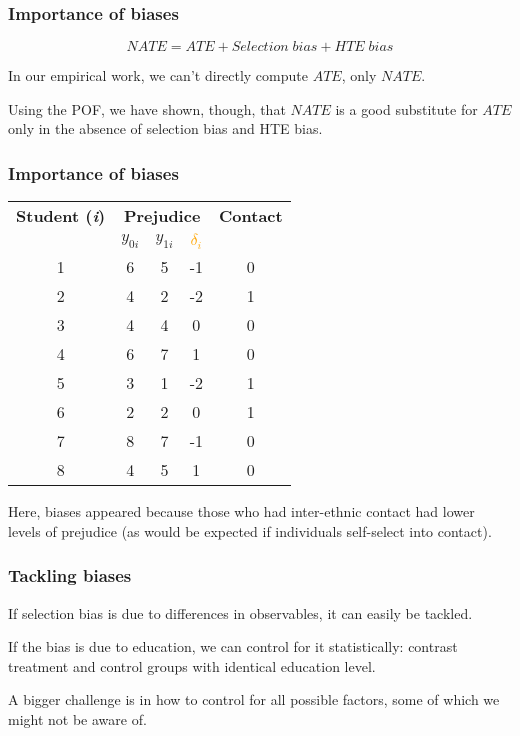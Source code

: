 \documentclass[12pt,english,dvipsnames,aspectratio=169,handout]{beamer}\usepackage[]{graphicx}\usepackage[]{xcolor}
\begin{document}
\begin{frame}
  \frametitle{Importance of biases}
  
  \begin{equation}
    NATE = ATE + Selection\;bias + HTE\;bias
  \end{equation}
  
  In our empirical work, we can't directly compute $ATE$, only $NATE$.\bigskip
  \pause
  
  Using the POF, we have shown, though, that $NATE$ is a good substitute for $ATE$ only in the absence of selection bias and HTE bias.
  
\end{frame}


\begin{frame}
  \frametitle{Importance of biases}
  
  \begin{table}[!ht]
  \centering
  \scriptsize
  \begin{tabular}{c c c c c}
  \toprule
  \textbf{Student (\textit{i})} & \multicolumn{3}{c}{\textbf{Prejudice}} & \textbf{Contact} \\
  & $y_{0i}$ & $y_{1i}$ & \textcolor{orange}{$\delta_i$} &  \\
  \midrule
  1 & 6 & 5 & -1 & 0 \\
  2 & 4 & 2 & -2 & 1 \\
  3 & 4 & 4 & 0 & 0\\
  4 & 6 & 7 & 1 & 0\\
  5 & 3 & 1 & -2 & 1 \\
  6 & 2 & 2 & 0 & 1\\
  7 & 8 & 7 & -1 & 0 \\
  8 & 4 & 5 & 1 & 0\\
  \bottomrule
  \end{tabular}
  \end{table}
  
  Here, biases appeared because those who had inter-ethnic contact had lower levels of prejudice (as would be expected if individuals self-select into contact).
  
\end{frame}

\begin{frame}
  \frametitle{Tackling biases}
  
  If selection bias is due to differences in observables, it can easily be tackled.\bigskip
  
  If the bias is due to education, we can control for it statistically: contrast treatment and control groups with identical education level.\bigskip
  
  \pause
  
  A bigger challenge is in how to control for all possible factors, some of which we might not be aware of.
  
\end{frame}
\end{document}
